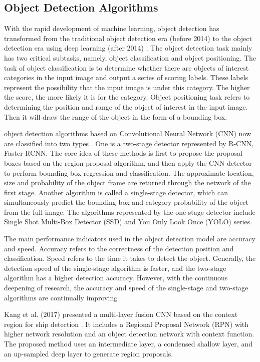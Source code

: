 \documentclass[journal,article,submit,moreauthors,pdftex]{Definitions/mdpi}
\begin{document}
\subsection{Object Detection Algorithms}
With the rapid development of machine learning, object detection has transformed from the traditional object detection era (before 2014) to the object detection era using deep learning (after 2014) \cite{zou2019object}. The object detection task mainly has two critical subtasks, namely, object classification and object positioning. The task of object classification is to determine whether there are objects of interest categories in the input image and output a series of scoring labels. These labels represent the possibility that the input image is under this category. The higher the score, the more likely it is for the category. Object positioning task refers to determining the position and range of the object of interest in the input image. Then it will draw the range of the object in the form of a bounding box.

object detection algorithms based on Convolutional Neural Network (CNN) now are classified into two types \cite{soviany2018optimizing, duan2020corner}. One is a two-stage detector represented by R-CNN, Faster-RCNN. The core idea of these methods is first to propose the proposal boxes based on the region proposal algorithm, and then apply the CNN detector to perform bounding box regression and classification. The approximate location, size and probability of the object frame are returned through the network of the first stage. Another algorithm is called a single-stage detector, which can simultaneously predict the bounding box and category probability of the object from the full image. The algorithms represented by the one-stage detector include Single Shot Multi-Box Detector (SSD) and You Only Look Once (YOLO) series.

The main performance indicators used in the object detection model are accuracy and speed. Accuracy refers to the correctness of the detection position and classification. Speed refers to the time it takes to detect the object. Generally, the detection speed of the single-stage algorithm is faster, and the two-stage algorithm has a higher detection accuracy. However, with the continuous deepening of research, the accuracy and speed of the single-stage and two-stage algorithms are continually improving

Kang et al. (2017) presented a multi-layer fusion CNN based on the context region for ship detection \cite{kang2017contextual}. It includes a Regional Proposal Network (RPN) with higher network resolution and an object detection network with context function. The proposed method uses an intermediate layer, a condensed shallow layer, and an up-sampled deep layer to generate region proposals.
\end{document}

